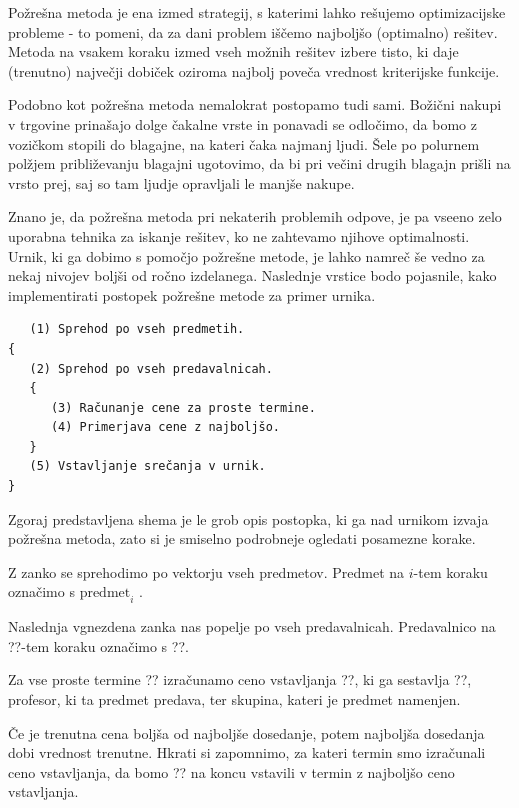 \documentclass[a4paper,10pt]{article}
\begin{document}
Požrešna metoda je ena izmed strategij, s katerimi lahko rešujemo optimizacijske probleme -
to pomeni, da za dani problem iščemo najboljšo (optimalno) rešitev. Metoda na vsakem koraku
izmed vseh možnih rešitev izbere  tisto, ki daje (trenutno) največji dobiček oziroma najbolj
poveča vrednost kriterijske funkcije.

Podobno kot požrešna metoda nemalokrat postopamo tudi sami. Božični nakupi v trgovine
prinašajo dolge čakalne vrste in ponavadi se odločimo, da bomo z vozičkom stopili do blagajne,
na kateri čaka najmanj ljudi. Šele po polurnem polžjem približevanju blagajni ugotovimo,
da bi pri večini drugih blagajn prišli na vrsto prej, saj so tam ljudje opravljali le
manjše nakupe.

Znano je, da požrešna metoda pri nekaterih problemih odpove, je pa vseeno zelo uporabna
tehnika za iskanje rešitev, ko ne zahtevamo njihove optimalnosti. Urnik, ki ga dobimo s
pomočjo požrešne metode, je lahko namreč še vedno za nekaj nivojev boljši od ročno izdelanega.
Naslednje vrstice bodo pojasnile, kako implementirati postopek požrešne metode za primer urnika.

\begin{verbatim}
   (1) Sprehod po vseh predmetih.
{
   (2) Sprehod po vseh predavalnicah.
   {
      (3) Računanje cene za proste termine.
      (4) Primerjava cene z najboljšo.
   }
   (5) Vstavljanje srečanja v urnik.
}
\end{verbatim}
%
Zgoraj predstavljena shema je le grob opis postopka, ki ga nad urnikom izvaja požrešna metoda,
zato si je smiselno podrobneje ogledati posamezne korake.

   Z zanko se sprehodimo po vektorju vseh predmetov. Predmet na \(i\)-tem koraku
   označimo s \(\text{predmet}_i\) .

   Naslednja vgnezdena zanka nas popelje po vseh predavalnicah. Predavalnico na
   ??-tem koraku označimo s ??.

   Za vse proste termine ?? izračunamo ceno vstavljanja
   ??, ki ga sestavlja ??, profesor, ki ta predmet predava,
   ter skupina, kateri je predmet namenjen.

   Če je trenutna cena boljša od najboljše dosedanje, potem najboljša dosedanja
   dobi vrednost trenutne. Hkrati si zapomnimo, za kateri termin smo izračunali ceno
   vstavljanja, da bomo ?? na koncu vstavili v termin z najboljšo
   ceno vstavljanja.
\end{document}
